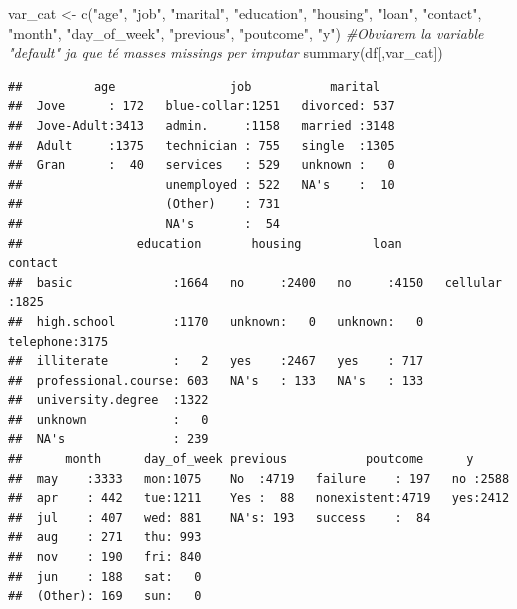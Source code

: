 \documentclass[
]{article}
\newenvironment{Shaded}{\begin{snugshade}}{\end{snugshade}}
\newcommand{\CommentTok}[1]{\textcolor[rgb]{0.56,0.35,0.01}{\textit{#1}}}
\newcommand{\FunctionTok}[1]{\textcolor[rgb]{0.00,0.00,0.00}{#1}}
\newcommand{\NormalTok}[1]{#1}
\newcommand{\OtherTok}[1]{\textcolor[rgb]{0.56,0.35,0.01}{#1}}
\newcommand{\StringTok}[1]{\textcolor[rgb]{0.31,0.60,0.02}{#1}}
\begin{document}
\begin{Shaded}
\begin{Highlighting}[]
\NormalTok{var\_cat }\OtherTok{\textless{}{-}} \FunctionTok{c}\NormalTok{(}\StringTok{"age"}\NormalTok{, }\StringTok{"job"}\NormalTok{, }\StringTok{"marital"}\NormalTok{, }\StringTok{"education"}\NormalTok{, }\StringTok{"housing"}\NormalTok{, }\StringTok{"loan"}\NormalTok{, }\StringTok{"contact"}\NormalTok{, }\StringTok{"month"}\NormalTok{, }\StringTok{"day\_of\_week"}\NormalTok{, }\StringTok{"previous"}\NormalTok{, }\StringTok{"poutcome"}\NormalTok{, }\StringTok{"y"}\NormalTok{) }\CommentTok{\#Obviarem la variable "default" ja que té masses missings per imputar}
\FunctionTok{summary}\NormalTok{(df[,var\_cat])}
\end{Highlighting}
\end{Shaded}

\begin{verbatim}
##          age                job           marital    
##  Jove      : 172   blue-collar:1251   divorced: 537  
##  Jove-Adult:3413   admin.     :1158   married :3148  
##  Adult     :1375   technician : 755   single  :1305  
##  Gran      :  40   services   : 529   unknown :   0  
##                    unemployed : 522   NA's    :  10  
##                    (Other)    : 731                  
##                    NA's       :  54                  
##                education       housing          loan           contact    
##  basic              :1664   no     :2400   no     :4150   cellular :1825  
##  high.school        :1170   unknown:   0   unknown:   0   telephone:3175  
##  illiterate         :   2   yes    :2467   yes    : 717                   
##  professional.course: 603   NA's   : 133   NA's   : 133                   
##  university.degree  :1322                                                 
##  unknown            :   0                                                 
##  NA's               : 239                                                 
##      month      day_of_week previous           poutcome      y       
##  may    :3333   mon:1075    No  :4719   failure    : 197   no :2588  
##  apr    : 442   tue:1211    Yes :  88   nonexistent:4719   yes:2412  
##  jul    : 407   wed: 881    NA's: 193   success    :  84             
##  aug    : 271   thu: 993                                             
##  nov    : 190   fri: 840                                             
##  jun    : 188   sat:   0                                             
##  (Other): 169   sun:   0
\end{verbatim}
\end{document}
